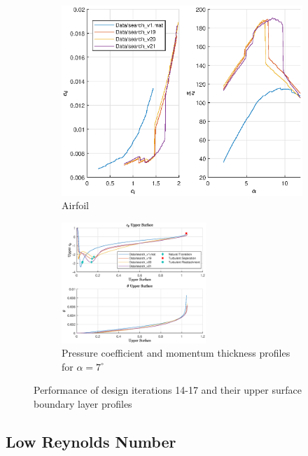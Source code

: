 \documentclass{article}
\begin{document}
\begin{figure}[H]
    \centering
    \begin{subfigure}{0.45\textwidth}
        \centering
        \includegraphics[width=1.2\textwidth, center]{figures/hiRe_lod_21.eps}
        \caption{Airfoil}
        \label{fig:v21_lod}
    \end{subfigure}
    \begin{subfigure}{0.54\textwidth}
        \centering
        \includegraphics[width=0.6\textwidth]{figures/hiRe_upperprofile_21_a7.eps}
        \caption{Pressure coefficient and momentum thickness profiles for $\alpha = 7^\circ$}
        \label{fig:v21_uprofile}
    \end{subfigure}
    \caption{Performance of design iterations 14-17 and their upper surface boundary layer profiles}
\end{figure}

\subsection{Low Reynolds Number}
\end{document}
